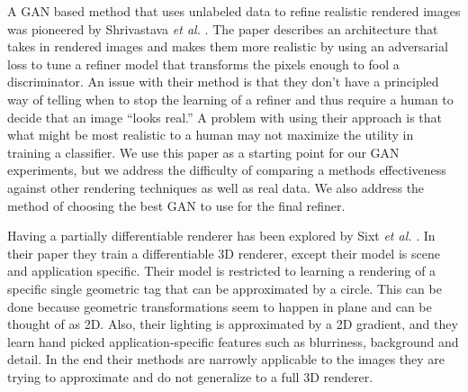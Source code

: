 \documentclass[10pt,twocolumn,letterpaper]{article}
\begin{document}
A GAN based method that uses unlabeled data to refine realistic rendered images was pioneered by
Shrivastava \textit{et al.} \cite{DBLP:journals/corr/ShrivastavaPTSW16}. The paper describes an architecture that takes in rendered images and makes them more realistic by using an adversarial loss to tune a refiner model that transforms the pixels enough to fool a discriminator.  An issue with their method is that they don't have a principled way of telling when to stop the learning of a refiner and thus require a human to decide that an image ``looks real.''  A problem with using their approach is that what might be most realistic to a human may not maximize the utility in training a classifier. We use this paper as a starting point for our GAN experiments,  but we address the difficulty of comparing a methods effectiveness against other rendering techniques as well as real data.  We also address the method of choosing the best GAN to use for the final refiner.  

Having a partially differentiable renderer has been explored by Sixt \textit{et al.} \cite{DBLP:journals/corr/SixtWL17}. In their paper they train a differentiable 3D renderer, except their model is scene and application specific. Their model is restricted to learning a rendering of a specific single geometric tag that can be approximated by a circle. This can be done because geometric transformations seem to happen in plane and can be thought of as 2D.  Also, their lighting is approximated by a 2D gradient, and they learn hand picked application-specific features such as blurriness, background and detail.  In the end their methods are narrowly applicable to the images they are trying to approximate and do not generalize to a full 3D renderer. \\


\end{document}
